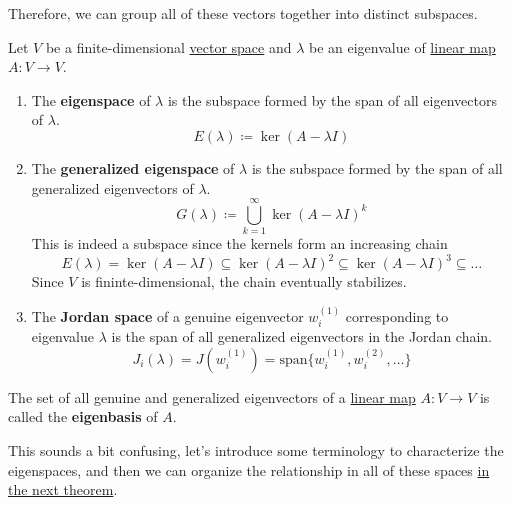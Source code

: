 	Therefore, we can group all of these vectors together into distinct subspaces. 

	\begin{definition}
	  \label{def:eigenspace-generalized-eigenspace-jordan-space}
		Let $V$ be a finite-dimensional \hyperref[def:vector-space]{vector space} and $\lambda$ be an eigenvalue of \hyperref[def:linear_map]{linear map} $A: V \to V$. 
		\begin{enumerate}
		  \item The \textbf{eigenspace} of $\lambda$ is the subspace formed by the span of all eigenvectors of $\lambda$. 
				\begin{equation}
				  E(\lambda) \coloneqq \ker (A - \lambda I)
				\end{equation}
			\item The \textbf{generalized eigenspace} of $\lambda$ is the subspace formed by the span of all generalized eigenvectors of $\lambda$. 
				\begin{equation}
					G(\lambda) \coloneqq \bigcup_{k = 1}^{\infty} \ker (A - \lambda I)^k 
				\end{equation}
				This is indeed a subspace since the kernels form an increasing chain 
				\begin{equation}
				  E(\lambda) = \ker(A - \lambda I) \subseteq \ker(A - \lambda I)^2 \subseteq \ker(A - \lambda I)^3 \subseteq \ldots 
				\end{equation}
				Since $V$ is fininte-dimensional, the chain eventually stabilizes. 

			\item The \textbf{Jordan space} of a genuine eigenvector $w_i^{(1)}$ corresponding to eigenvalue $\lambda$ is the span of all generalized eigenvectors in the Jordan chain. 
				\begin{equation}
					J_i (\lambda) = J(w_i^{(1)}) = \mathrm{span}\{w_i^{(1)}, w_i^{(2)}, \ldots \}
				\end{equation}
		\end{enumerate}
  \end{definition} 

	\begin{definition}[Eigenbasis]
	  \label{def:eigenbasis}
	  The set of all genuine and generalized eigenvectors of a \hyperref[def:linear_map]{linear map} $A: V \to V$ is called the \textbf{eigenbasis} of $A$. 
	\end{definition}

	This sounds a bit confusing, let's introduce some terminology to characterize the eigenspaces, and then we can organize the relationship in all of these spaces \href{thm:eigendecomposition}{in the next theorem}. 

